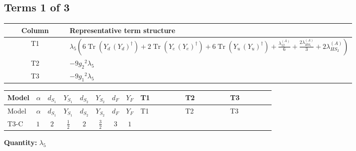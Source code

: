 \documentclass[8pt]{article}
\begin{document}
\begin{landscape}
\subsection*{Terms 1 of 3}
\begin{center}
\begin{tabular}{@{}c >{\raggedright\arraybackslash}p{0.82\linewidth}@{}}
\toprule
Column & Representative term structure \\
\midrule
T1 & \(\displaystyle {\lambda_5} \left(6 \operatorname{Tr}\!\left({Y_d}\,\left({Y_d}\right)^{\dagger}\right)+2 \operatorname{Tr}\!\left({Y_e}\,\left({Y_e}\right)^{\dagger}\right)+6 \operatorname{Tr}\!\left({Y_u}\,\left({Y_u}\right)^{\dagger}\right)+\frac{{\lambda_{12}^{(A)}}}{6}+\frac{2 {\lambda_{HS_1}^{(A)}}}{3}+2 {\lambda_{HS_2}^{(A)}}\right)\) \\
\midrule
T2 & \(\displaystyle -9 {g_2}^2 {\lambda_5}\) \\
\midrule
T3 & \(\displaystyle -9 {g_1}^2 {\lambda_5}\) \\
\midrule
\bottomrule
\end{tabular}
\end{center}
\smallskip
\tiny
\begin{longtable}{@{}llcccccc >{\raggedright\arraybackslash}p{0.21\linewidth} >{\raggedright\arraybackslash}p{0.21\linewidth} >{\raggedright\arraybackslash}p{0.21\linewidth}@{}}
\toprule
Model & $\alpha$ & $d_{S_1}$ & $Y_{S_1}$ & $d_{S_2}$ & $Y_{S_2}$ & $d_F$ & $Y_F$ & T1 & T2 & T3 \\
\midrule
\endfirsthead
\toprule
Model & $\alpha$ & $d_{S_1}$ & $Y_{S_1}$ & $d_{S_2}$ & $Y_{S_2}$ & $d_F$ & $Y_F$ & T1 & T2 & T3 \\
\midrule
\endhead
T3-C & $1$ & $2$ & $\frac{1}{2}$ & $2$ & $\frac{3}{2}$ & $3$ & $1$ & \scriptsize\adjustbox{max width=\linewidth}{$\begin{gathered} {\lambda_5} \left(6 \operatorname{Tr}\!\left({Y_d}\,\left({Y_d}\right)^{\dagger}\right)+2 \operatorname{Tr}\!\left({Y_e}\,\left({Y_e}\right)^{\dagger}\right)+6 \operatorname{Tr}\!\left({Y_u}\,\left({Y_u}\right)^{\dagger}\right)+\frac{{\lambda_{12}^{(A)}}}{6}+\frac{2 {\lambda_{HS_1}^{(A)}}}{3}+2 {\lambda_{HS_2}^{(A)}}\right)\end{gathered}$} & \scriptsize\adjustbox{max width=\linewidth}{$\begin{gathered} -9 {g_2}^2 {\lambda_5}\end{gathered}$} & \scriptsize\adjustbox{max width=\linewidth}{$\begin{gathered} -9 {g_1}^2 {\lambda_5}\end{gathered}$} \\
\midrule
\bottomrule
\end{longtable}
\clearpage
\noindent\textbf{Quantity: }$\lambda_5$\par\smallskip

\end{landscape}
\end{document}
